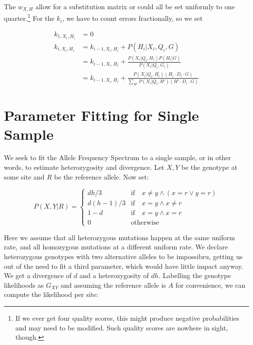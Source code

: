 \documentclass{article}
\begin{document}
The $w_{X,H}$ allow for a substitution matrix or could all be set uniformly to
one quarter.\footnote{If we ever get four quality scores, this might produce
negative probabilities and may need to be modified.  Such quality scores are
nowhere in sight, though.}  For the $k_i$, we have to count errors
fractionally, so we set

\begin{align*}
k_{1,X_i,H_i} &= 0 \\
k_{i,X_i,H_i} &= k_{i-1,X_i,H_i} + P(H_i | X_i, Q_i, G) \\
&= k_{i-1,X_i,H_i} + \frac{P(X_i | Q_i, H_i) P(H_i | G)}{P(X_i|Q_i, G_i)} \\
&= k_{i-1,X_i,H_i} + \frac{P(X_i | Q_i, H_i) \left( H_i \cdot D_i \cdot G \right) }
    {\sum_{H'} P(X_i| Q_i, H') \left( H' \cdot D_i \cdot G \right)}
\end{align*}


\section{Parameter Fitting for Single Sample}

We seek to fit the Allele Frequency Spectrum to a single sample, or in
other words, to estimate heterozygosity and divergence.  Let $X,Y$ be
the genotype at some site and $R$ be the reference allele.  Now set:

\begin{equation*}
P(X,Y|R) = \left\{ \begin{array}{cl}
    dh/3 & \mbox{if} \quad x \neq y \wedge (x=r \vee y=r) \\
    d(h-1)/3 & \mbox{if} \quad x=y \wedge x \neq r \\
    1 - d & \mbox{if} \quad x=y \wedge x=r \\
    0 & \mbox{otherwise}
        \end{array} \right.
\end{equation*}

Here we assume that all heterozygous mutations happen at the same
uniform rate, and all homozygous mutations at a different uniform rate.
We declare heterozygous genotypes with two alternative alleles to be
impossibru, getting us out of the need to fit a third parameter, which
would have little impact anyway.  We get a divergence of $d$ and a
heterozygosity of $dh$.  Labelling the genotype likelihoods as $G_{XY}$
and assuming the reference allele is $A$ for convenience, we can compute
the likelihood per site:
\end{document}
